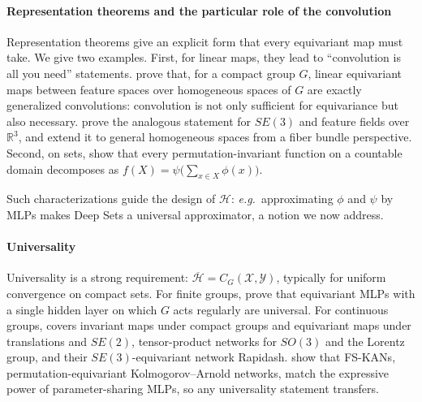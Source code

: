 \documentclass[mathematics,review,submit,moreauthors]{Definitions/mdpi}
\begin{document}
\paragraph{Representation theorems and the particular role of the convolution}
Representation theorems give an explicit form that every equivariant map must take.
We give two examples.
First, for linear maps, they lead to ``convolution is all you need'' statements.
\citet{kondor2018p3icml} prove that, for a compact group $G$, linear equivariant maps between feature spaces over homogeneous spaces of $G$ are exactly generalized convolutions: convolution is not only sufficient for equivariance but also necessary.
\citet{weiler2018anips} prove the analogous statement for $SE(3)$ and feature fields over $\mathbb{R}^3$, and \citet{cohen2019anips} extend it to general homogeneous spaces from a fiber bundle perspective.
Second, on sets, \citet{zaheer2018} show that every permutation-invariant function on a countable domain decomposes as $f(X)=\psi\big(\sum_{x\in X}\phi(x)\big)$.

Such characterizations guide the design of $\mathcal{H}$: \textit{e.g.}\ approximating $\phi$ and $\psi$ by MLPs makes Deep Sets a universal approximator, a notion we now address.

\paragraph{Universality}
Universality is a strong requirement: $\overline{\mathcal{H}} = C_G(\mathcal{X},\mathcal{Y})$, typically for uniform convergence on compact sets.
For finite groups, \citet{ravanbakhsh2020p3icml} prove that equivariant MLPs with a single hidden layer on which $G$ acts regularly are universal.
For continuous groups, \citet{yarotsky2018r} covers invariant maps under compact groups and equivariant maps under translations and $SE(2)$, \citet{bogatskiy2020p3icml} tensor-product networks for $SO(3)$ and the Lorentz group, and \citet{vadgama2025} their $SE(3)$-equivariant network Rapidash.
\citet{elbaz2025} show that FS-KANs, permutation-equivariant Kolmogorov--Arnold networks, match the expressive power of parameter-sharing MLPs, so any universality statement transfers.
\end{document}
